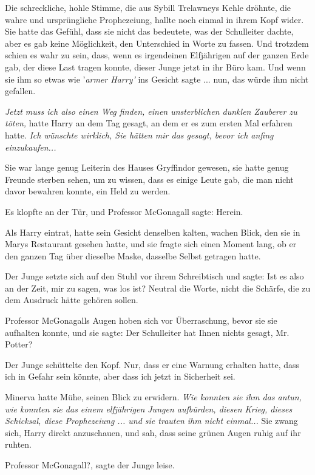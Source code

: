 Die schreckliche, hohle Stimme, die aus Sybill Trelawneys Kehle dröhnte, die
wahre und ursprüngliche Prophezeiung, hallte noch einmal in ihrem Kopf wider.
Sie hatte das Gefühl, dass sie nicht das bedeutete, was der Schulleiter dachte,
aber es gab keine Möglichkeit, den Unterschied in Worte zu fassen. Und trotzdem
schien es wahr zu sein, dass, wenn es irgendeinen Elfjährigen auf der ganzen
Erde gab, der diese Last tragen konnte, dieser Junge jetzt in ihr Büro kam. Und
wenn sie ihm so etwas wie '\emph{armer Harry'} ins Gesicht sagte ... nun, das
würde ihm nicht gefallen.

\emph{Jetzt muss ich also einen Weg finden, einen unsterblichen dunklen Zauberer
zu töten, }hatte Harry an dem Tag gesagt, an dem er es zum ersten Mal erfahren
hatte. \emph{Ich wünschte wirklich, Sie hätten mir das gesagt, bevor ich anfing
einzukaufen... }

Sie war lange genug Leiterin des Hauses Gryffindor gewesen, sie hatte genug
Freunde sterben sehen, um zu wissen, dass es einige Leute gab, die man nicht
davor bewahren konnte, ein Held zu werden.

Es klopfte an der Tür, und Professor McGonagall sagte: \glqq Herein.\grqq{}

Als Harry eintrat, hatte sein Gesicht denselben kalten, wachen Blick, den sie in
Marys Restaurant gesehen hatte, und sie fragte sich einen Moment lang, ob er den
ganzen Tag über dieselbe Maske, dasselbe Selbst getragen hatte.

Der Junge setzte sich auf den Stuhl vor ihrem Schreibtisch und sagte: \glqq Ist
es also an der Zeit, mir zu sagen, was los ist?\grqq{} Neutral die Worte, nicht
die Schärfe, die zu dem Ausdruck hätte gehören sollen.

Professor McGonagalls Augen hoben sich vor Überraschung, bevor sie sie aufhalten
konnte, und sie sagte: \glqq Der Schulleiter hat Ihnen nichts gesagt, Mr.
Potter?\grqq{}

Der Junge schüttelte den Kopf. \glqq Nur, dass er eine Warnung erhalten hatte,
dass ich in Gefahr sein könnte, aber dass ich jetzt in Sicherheit sei.\grqq{}

Minerva hatte Mühe, seinen Blick zu erwidern. \emph{Wie konnten sie ihm das
antun, wie konnten sie das einem elfjährigen Jungen aufbürden, diesen Krieg,
dieses Schicksal, diese Prophezeiung ... und sie trauten ihm nicht einmal...}
Sie zwang sich, Harry direkt anzuschauen, und sah, dass seine grünen Augen ruhig
auf ihr ruhten.

\glqq Professor McGonagall?\grqq{}, sagte der Junge leise.

